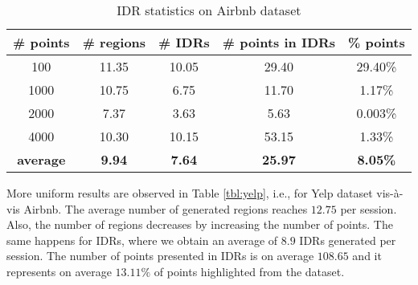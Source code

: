\documentclass[sigconf,edbt]{acmart-edbt2019}
\begin{document}
\begin{table}[t]
\centering
\caption{IDR statistics on \textsf{Airbnb} dataset}
\label{tbl:airbnb}
\begin{tabular}{|c|c|c|c|c|}
\cline{1-5}
\textbf{\# points}  & \textbf{\# regions} 	& \textbf{\# IDRs} 	& \textbf{\# points in IDRs}	& \textbf{\%  points}	\\ \hline
\multicolumn{1}{|c|}{100} 				& 11.35            	& 10.05	          	& 29.40             & 29.40\%            
 \\ \hline
\multicolumn{1}{|c|}{1000} 				& 10.75          	& 6.75	          	& 11.70              & 1.17\%              \\ \hline
\multicolumn{1}{|c|}{2000} 				& 7.37           	& 3.63         	& 5.63             & 0.003\%              \\ \hline
\multicolumn{1}{|c|}{4000} 				& 10.30           	& 10.15	          	& 53.15              & 1.33\%              \\ \hline
\multicolumn{1}{|c|}{\textbf{average}} 				& \textbf{9.94}           	& \textbf{7.64}	          	&\textbf{ 25.97}              & \textbf{8.05\% }             \\ \hline

\end{tabular}
\end{table}

\vspace{2pt}
More uniform results are observed in Table \ref{tbl:yelp}, i.e., for \textsf{Yelp} dataset vis-\`a-vis \textsf{Airbnb}. The average number of generated regions reaches $12.75$ per session. Also, the number of regions decreases by increasing the number of points. The same happens for IDRs, where we obtain an average of $8.9$ IDRs generated per session. The number of points presented in IDRs is on average $108.65$ and it represents on average $13.11\%$ of points highlighted from the dataset.

\end{document}
